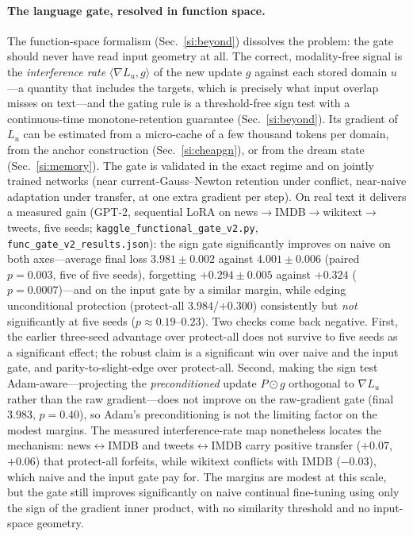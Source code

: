 \documentclass[10pt,a4paper]{article}
\theoremstyle{plain}
\theoremstyle{definition}
\begin{document}
\paragraph{The language gate, resolved in function space.} The function-space formalism
(Sec.~\ref{si:beyond}) dissolves the problem: the gate should
never have read input geometry at all. The correct, modality-free signal is the
\emph{interference rate} $\langle\nabla L_u,g\rangle$ of the new update $g$ against each
stored domain $u$---a quantity that includes the targets, which is precisely what input
overlap misses on text---and the gating rule is a threshold-free sign test with a
continuous-time monotone-retention guarantee (Sec.~\ref{si:beyond}). Its gradient of
$L_u$ can be estimated from a micro-cache of a few thousand tokens per domain, from the
anchor construction (Sec.~\ref{si:cheapgn}), or from the dream state
(Sec.~\ref{si:memory}). The gate is validated in the exact regime and on jointly trained
networks (near current-Gauss--Newton retention under conflict, near-naive adaptation under
transfer, at one extra gradient per step). On real text it delivers a measured gain
(GPT-2, sequential LoRA on news$\to$IMDB$\to$wikitext$\to$tweets, five seeds;
\texttt{kaggle\_functional\_gate\_v2.py}, \texttt{func\_gate\_v2\_results.json}): the sign
gate significantly improves on naive on both axes---average final loss
$3.981\pm0.002$ against $4.001\pm0.006$ (paired $p=0.003$, five of five seeds), forgetting
$+0.294\pm0.005$ against $+0.324$ ($p=0.0007$)---and on the input gate by a similar margin,
while edging unconditional protection (protect-all $3.984$/$+0.300$) consistently but
\emph{not} significantly at five seeds ($p\approx0.19$--$0.23$). Two checks come
back negative. First, the earlier three-seed advantage over protect-all does not
survive to five seeds as a significant effect; the robust claim is a significant win over
naive and the input gate, and parity-to-slight-edge over protect-all. Second, making the
sign test Adam-aware---projecting the \emph{preconditioned} update
$P\odot g$ orthogonal to $\nabla L_u$ rather than the raw gradient---does not improve on the
raw-gradient gate (final $3.983$, $p=0.40$), so Adam's preconditioning is not the
limiting factor on the modest margins. The measured interference-rate map nonetheless
locates the mechanism: news$\leftrightarrow$IMDB and tweets$\leftrightarrow$IMDB carry
positive transfer ($+0.07$, $+0.06$) that protect-all forfeits, while wikitext conflicts
with IMDB ($-0.03$), which naive and the input gate pay for. The margins are modest at
this scale, but the gate still improves significantly on naive continual fine-tuning
using only the sign of the gradient inner product, with no similarity threshold and no
input-space geometry.
\end{document}
